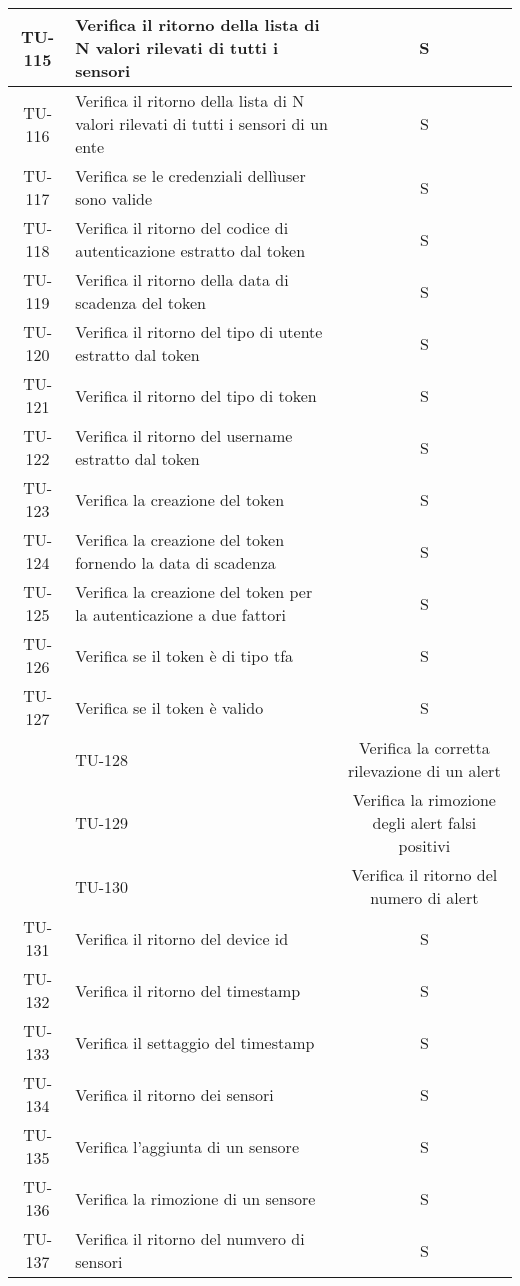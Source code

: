 \begin{center}
\begin{longtable}{|c|p{12cm}|c|}
			\hline
			TU-115 & Verifica il ritorno della lista di N valori rilevati di tutti i sensori & S \\
			\hline
			TU-116 & Verifica il ritorno della lista di N valori rilevati di tutti i sensori di un ente & S \\
			\hline
			TU-117 & Verifica se le credenziali dellìuser sono valide & S \\
			\hline
			TU-118 & Verifica il ritorno del codice di autenticazione estratto dal token & S \\
			\hline
			TU-119 & Verifica il ritorno della data di scadenza del token & S \\
			\hline
			TU-120 & Verifica il ritorno del tipo di utente estratto dal token & S \\
			\hline
			TU-121 & Verifica il ritorno del tipo di token & S \\
			\hline
			TU-122 & Verifica il ritorno del username estratto dal token & S \\
			\hline
			TU-123 & Verifica la creazione del token & S \\
			\hline
			TU-124 & Verifica la creazione del token fornendo la data di scadenza & S \\
			\hline
			TU-125 & Verifica la creazione del token per la autenticazione a due fattori & S \\
			\hline
			TU-126 & Verifica se il token è di tipo tfa & S \\
			\hline
			TU-127 & Verifica se il token è valido & S \\
			\hline
		 & TU-128 & Verifica la corretta rilevazione di un alert	 \\
			\hline
		 & TU-129 & Verifica la rimozione degli alert falsi positivi	 \\
			\hline
		 & TU-130 & Verifica il ritorno del numero di alert	 \\
			\hline
			TU-131 & Verifica il ritorno del device id & S \\
			\hline
			TU-132 & Verifica il ritorno del timestamp & S \\
			\hline
			TU-133 & Verifica il settaggio del timestamp & S \\
			\hline
			TU-134 & Verifica il ritorno dei sensori & S \\
			\hline
			TU-135 & Verifica l'aggiunta di un sensore & S \\
			\hline
			TU-136 & Verifica la rimozione di un sensore & S \\
			\hline
			TU-137 & Verifica il ritorno del numvero di sensori & S \\

\end{longtable}
\end{center}
